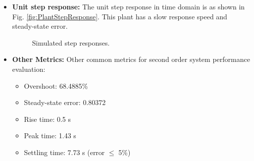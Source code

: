 \documentclass[12pt, oneside]{article}
\begin{document}
\begin{itemize}
    
    \item \textbf{Unit step response:} The unit step response in time domain is as shown in Fig. \ref{fig:PlantStepResponse}. This plant has a slow response speed and steady-state error.


        \begin{figure}[htbp]
          \centering
          \quad %
          \caption{Simulated step responses.}
        \end{figure}

    \item \textbf{Other Metrics:}  Other common metrics for second order system performance evaluation:
        \begin{itemize}
            \item Overshoot: 68.4885\%
            \item Steady-state error: 0.80372
            \item Rise time: 0.5 s
            \item Peak time: 1.43 s
            \item Settling time: 7.73 s (error $\leq$ 5\%)
        \end{itemize}
\end{itemize}
\end{document}
